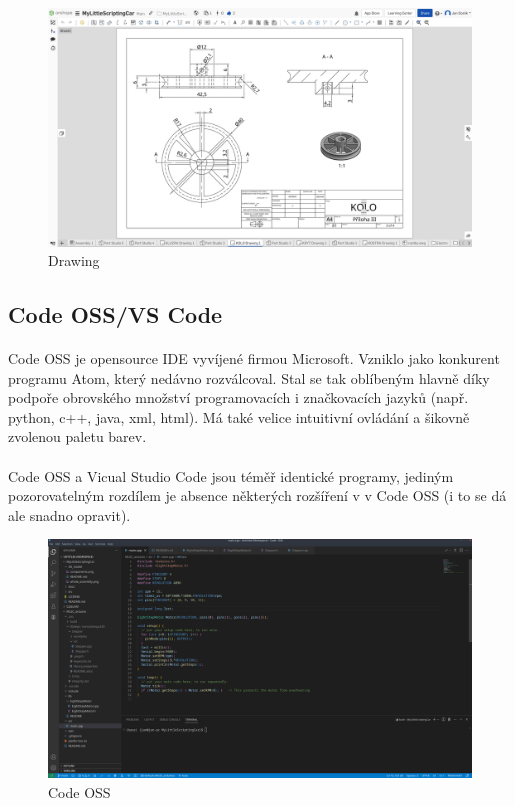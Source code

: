 \documentclass[12pt]{article}
\begin{document}
\begin{spacing}{1.5}
	\begin{figure}[H]
		\centering
		\includegraphics[width=\linewidth]{images/drawing_studio.png}
		\caption{Drawing}
		\label{fig:drawing_studio}
	\end{figure}
	
	\subsection{Code OSS/VS Code}
	\paragraph{} Code OSS je opensource IDE vyvíjené firmou Microsoft. Vzniklo jako konkurent programu Atom, který nedávno rozválcoval. Stal se tak oblíbeným hlavně díky podpoře obrovského množství programovacích i značkovacích jazyků (např. python, c++, java, xml, html). Má také velice intuitivní ovládání a šikovně zvolenou paletu barev.
	
	\paragraph{} Code OSS a Vicual Studio Code jsou téměř identické programy, jediným pozorovatelným rozdílem je absence některých rozšíření v  v Code OSS (i to se dá ale snadno opravit).
	
	\begin{figure}[H]
		\centering
		\includegraphics[width=\linewidth]{images/code_oss.png}
		\caption{Code OSS}
		\label{fig:code_oss}
	\end{figure}
	

\end{spacing}
\end{document}
